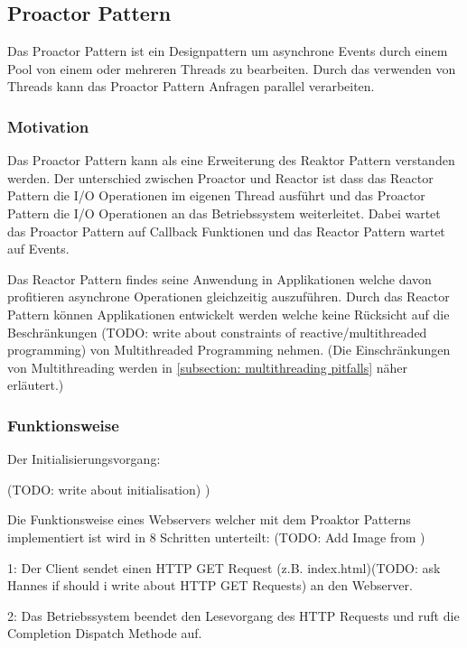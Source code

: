\subsection{Proactor Pattern}
\label{section: Proactor Pattern}

Das Proactor Pattern ist ein Designpattern um asynchrone Events durch einem Pool von einem oder mehreren Threads zu bearbeiten. Durch das verwenden von Threads kann das Proactor Pattern Anfragen parallel verarbeiten. 

\subsubsection{Motivation}
Das Proactor Pattern kann als eine Erweiterung des Reaktor Pattern verstanden werden. Der unterschied zwischen Proactor und Reactor ist dass das Reactor Pattern die I/O Operationen im eigenen Thread ausführt und das Proactor Pattern die I/O Operationen an das Betriebssystem weiterleitet. Dabei wartet das Proactor Pattern auf Callback Funktionen und das Reactor Pattern wartet auf Events. \cite[p. 7]{CZY2009}

Das Reactor Pattern findes seine Anwendung in Applikationen welche davon profitieren asynchrone Operationen gleichzeitig auszuführen. Durch das Reactor Pattern können Applikationen entwickelt werden welche keine Rücksicht auf die Beschränkungen (TODO: write about constraints of reactive/multithreaded programming) von Multithreaded Programming nehmen. (Die Einschränkungen von Multithreading werden in \ref{subsection: multithreading pitfalls} näher erläutert.) \cite[p. 1]{Sch97}

\subsubsection{Funktionsweise}

Der Initialisierungsvorgang:

(TODO: write about initialisation)
\cite[p. 3]{Sch97})


Die Funktionsweise eines Webservers welcher mit dem Proaktor Patterns implementiert ist wird in 8 Schritten unterteilt: 
(TODO: Add Image from \cite[p. 4]{Sch97})

1: Der Client sendet einen HTTP GET Request (z.B. index.html)(TODO: ask Hannes if should i write about HTTP GET Requests) an den Webserver.  

2: Das Betriebssystem beendet den Lesevorgang des HTTP Requests und ruft die Completion Dispatch Methode auf. 

